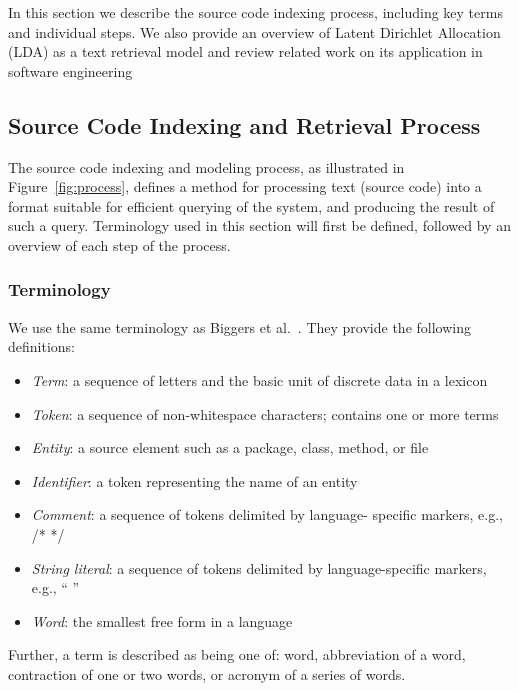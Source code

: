 
%
In this section we describe the source code indexing process,
including key terms and individual steps.
We also provide an overview of Latent Dirichlet Allocation (LDA) as a text retrieval model
and review related work on its application in software engineering

\subsection{Source Code Indexing and Retrieval Process}

The source code indexing and modeling process,
as illustrated in Figure~\ref{fig:process},
defines a method for processing text (source code) into
a format suitable for efficient querying of the system, and
producing the result of such a query.
Terminology used in this section will first be defined, followed by an overview of each step of the process.

    \subsubsection{Terminology}
    We use the same terminology as Biggers et al.~\cite{Biggers2010}.
    They provide the following definitions:
    \begin{itemize}
    \item \textit{Term}: a sequence of letters and the basic unit of discrete data in a lexicon
    \item \textit{Token}: a sequence of non-whitespace characters; contains one or more terms
    \item \textit{Entity}: a source element such as a package, class, method, or file
    \item \textit{Identifier}: a token representing the name of an entity
    \item \textit{Comment}: a sequence of tokens delimited by language-
    specific markers, e.g., /* */
    \item \textit{String literal}: a sequence of tokens delimited by
    language-specific markers, e.g., “ ”
    \item \textit{Word}: the smallest free form in a language
    \end{itemize}
    Further, a term is described as being one of:
    word,
    abbreviation of a word,
    contraction of one or two words,
    or acronym of a series of words.

